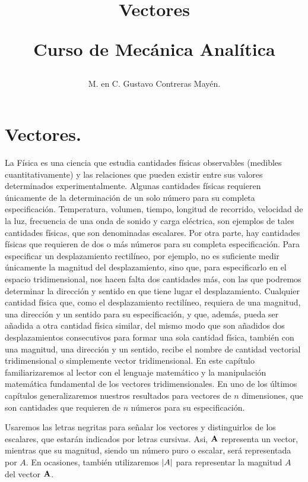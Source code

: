 \documentclass[12pt]{article}
\title{Vectores \\ \begin{Large} Curso de Mecánica Analítica \end{Large}}
\author{M. en C. Gustavo Contreras Mayén.}
\date{ }
\begin{document}
\maketitle
\fontsize{14}{14}\selectfont

\tableofcontents

\newpage

\section{Vectores.}

La Física es una ciencia que estudia cantidades físicas observables (medibles cuantitativamente) y las relaciones que pueden existir entre sus valores determinados experimentalmente. Algunas cantidades físicas requieren únicamente de la determinación de un solo número para su completa especificación. Temperatura, volumen, tiempo, longitud de recorrido, velocidad de la luz, frecuencia de una onda de sonido y carga eléctrica, son ejemplos de tales cantidades físicas, que son denominadas escalares. Por otra parte, hay cantidades físicas que requieren de dos o más números para su completa especificación. Para especificar un desplazamiento rectilíneo, por ejemplo, no es suficiente medir únicamente la magnitud del desplazamiento, sino que, para especificarlo en el espacio tridimensional, nos hacen falta dos cantidades más, con las que podremos determinar la dirección y sentido en que tiene lugar el desplazamiento. Cualquier cantidad física que, como el desplazamiento rectilíneo, requiera de una magnitud, una dirección y un sentido para su especificación, y que, además, pueda ser añadida a otra cantidad física similar, del mismo modo que son añadidos dos 
desplazamientos consecutivos para formar una sola cantidad física, también con una magnitud, una dirección y un sentido, recibe el nombre de cantidad vectorial tridimensional o simplemente vector tridimensional. En este capítulo familiarizaremos al lector con el lenguaje matemático y la manipulación matemática fundamental de los vectores tridimensionales. En uno de los últimos capítulos generalizaremos nuestros resultados para vectores de $n$ dimensiones, que son cantidades que requieren de $n$ números para su especificación. 
\par
Usaremos las letras negritas para señalar los vectores y distinguirlos de los escalares, que estarán indicados por letras cursivas. Asi, $\vb{A}$ representa un vector, mientras que su magnitud, siendo un número puro o escalar, será representada por $A$. En ocasiones, también utilizaremos $\abs{A}$ para representar la magnitud $A$ del vector $\vb{A}$.
\end{document}
